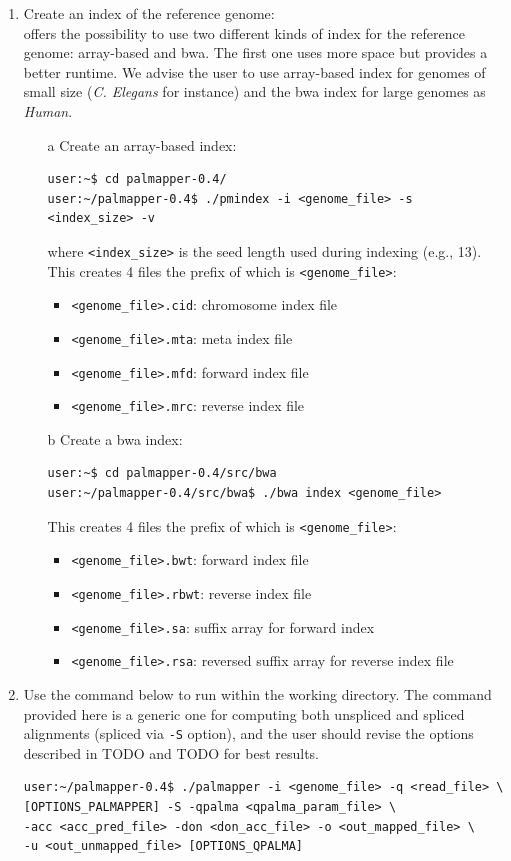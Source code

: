 \documentclass{article}
\begin{document}
\begin{enumerate}
\item Create an index of the reference genome:\\
\PALMapper{} offers the possibility to use two different kinds of
index for the reference genome: array-based and bwa. The first one
uses more space but provides a better runtime. We advise the user to
use array-based index for genomes of small size (\emph{C. Elegans} for
instance) and the bwa index for large genomes as \emph{Human}.
\begin{itemize}
\item[a] Create an array-based index:
\begin{verbatim}
user:~$ cd palmapper-0.4/
user:~/palmapper-0.4$ ./pmindex -i <genome_file> -s <index_size> -v
\end{verbatim}
where \texttt{<index\_size>} is the seed length used during indexing
(e.g., 13). This creates 4 files the prefix of which is
\texttt{<genome\_file>}:
\begin{itemize}
\item \texttt{<genome\_file>.cid}: chromosome index file
\item \texttt{<genome\_file>.mta}: meta index file
\item \texttt{<genome\_file>.mfd}: forward index file
\item \texttt{<genome\_file>.mrc}: reverse index file
\end{itemize}

\item [b] Create a bwa index:
\begin{verbatim}
user:~$ cd palmapper-0.4/src/bwa
user:~/palmapper-0.4/src/bwa$ ./bwa index <genome_file>
\end{verbatim}
This creates 4 files the prefix of which is \texttt{<genome\_file>}:
\begin{itemize}
\item \texttt{<genome\_file>.bwt}: forward index file
\item \texttt{<genome\_file>.rbwt}: reverse index file
\item \texttt{<genome\_file>.sa}: suffix array for forward index
\item \texttt{<genome\_file>.rsa}: reversed suffix array for reverse
  index file
\end{itemize}
\end{itemize}

\item Use the command below to run \PALMapper{} within the working directory. The
command provided here is a generic one for computing both unspliced and spliced
alignments (spliced via \texttt{-S} option), and the user should
revise the options described in TODO and TODO for best results.
\begin{verbatim}
user:~/palmapper-0.4$ ./palmapper -i <genome_file> -q <read_file> \
[OPTIONS_PALMAPPER] -S -qpalma <qpalma_param_file> \
-acc <acc_pred_file> -don <don_acc_file> -o <out_mapped_file> \
-u <out_unmapped_file> [OPTIONS_QPALMA]
\end{verbatim}


\end{enumerate}
\end{document}
